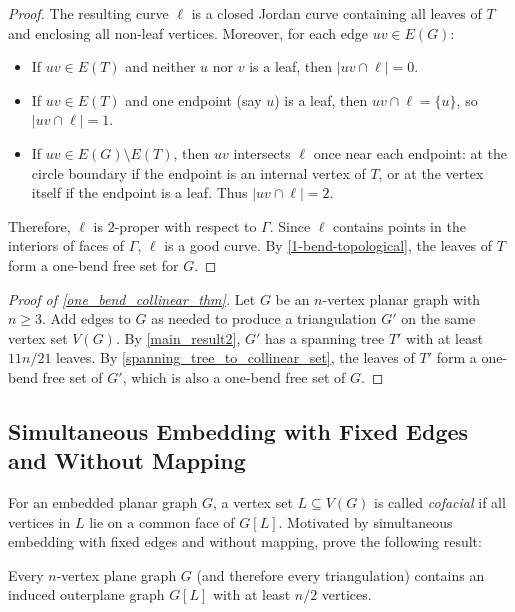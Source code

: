 \documentclass{patmorin}
\newcommand{\defin}[1]{\emph{\textcolor{brightmaroon}{#1}}}
\begin{document}
\begin{proof}
The resulting curve $\ell$ is a closed Jordan curve containing all leaves of $T$ and enclosing all non-leaf vertices. Moreover, for each edge $uv \in E(G)$:
\begin{itemize}[nosep,nolistsep]
    \item If $uv \in E(T)$ and neither $u$ nor $v$ is a leaf, then $|uv \cap \ell| = 0$.
    \item If $uv \in E(T)$ and one endpoint (say $u$) is a leaf, then $uv\cap\ell = \{u\}$, so $|uv \cap \ell| = 1$.
    \item If $uv \in E(G) \setminus E(T)$, then $uv$ intersects $\ell$ once near each endpoint: at the circle boundary if the endpoint is an internal vertex of $T$, or at the vertex itself if the endpoint is a leaf. Thus $|uv \cap \ell| = 2$.
\end{itemize}
Therefore, $\ell$ is $2$-proper with respect to $\Gamma$. Since $\ell$ contains points in the interiors of faces of $\Gamma$, $\ell$ is a good curve. By \cref{1-bend-topological}, the leaves of $T$ form a one-bend free set for $G$.
\end{proof}

\begin{proof}[Proof of \cref{one_bend_collinear_thm}]
Let $G$ be an $n$-vertex planar graph with $n\ge 3$. Add edges to $G$ as needed to produce a triangulation $G'$ on the same vertex set $V(G)$. By \cref{main_result2}, $G'$ has a spanning tree $T'$ with at least $11n/21$ leaves. By \cref{spanning_tree_to_collinear_set}, the leaves of $T'$ form a one-bend free set of $G'$, which is also a one-bend free set of $G$.
\end{proof}

\subsection{Simultaneous Embedding with Fixed Edges and Without Mapping}

For an embedded planar graph $G$, a vertex set $L \subseteq V(G)$ is called \defin{cofacial} if all vertices in $L$ lie on a common face of $G[L]$. Motivated by simultaneous embedding with fixed edges and without mapping, \citet{angelini.evans.ea:sefe} prove the following result:

\begin{thm}
\label{induced_outerplane_orig}
    Every $n$-vertex plane graph $G$ (and therefore every triangulation) contains an induced outerplane graph $G[L]$ with at least $n/2$ vertices.
\end{thm}
\end{document}
